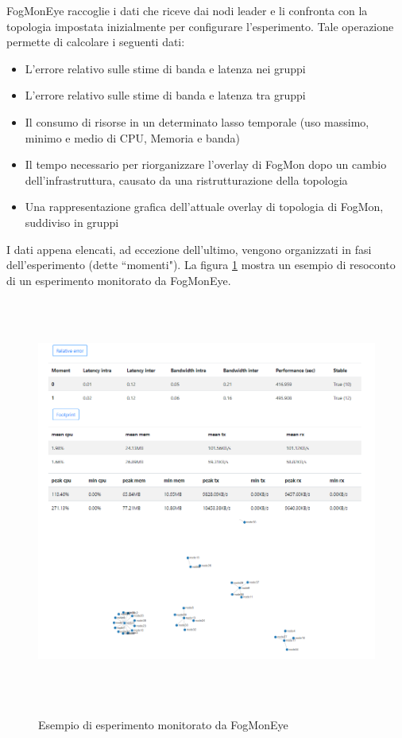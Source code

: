         FogMonEye raccoglie i dati che riceve dai nodi leader e li confronta con la topologia impostata inizialmente per configurare l'esperimento. Tale operazione permette di calcolare i seguenti dati: 
        \begin{itemize}
            \item L'errore relativo sulle stime di banda e latenza nei gruppi
        
            \item L'errore relativo sulle stime di banda e latenza tra gruppi
        
            \item Il consumo di risorse in un determinato lasso temporale (uso massimo, minimo e medio di CPU, Memoria e banda)
        
            \item Il tempo necessario per riorganizzare l'overlay di FogMon dopo un cambio dell'infrastruttura, causato da una ristrutturazione della topologia 
            
            \item Una rappresentazione grafica dell'attuale overlay di topologia di FogMon, suddiviso in gruppi 
        \end{itemize}
        I dati appena elencati, ad eccezione dell'ultimo, vengono organizzati in fasi dell'esperimento (dette ``momenti"). La figura \ref{fig:Eye} mostra un esempio di resoconto di un esperimento monitorato da FogMonEye.
        \begin{figure}
        \begin{center}
            \includegraphics[width=15.6cm, height=13.4cm]{images/Eye.PNG}
            \label {fig:Eye}
            \caption {Esempio di esperimento monitorato da FogMonEye}
        \end{center}
        \end {figure}
        
